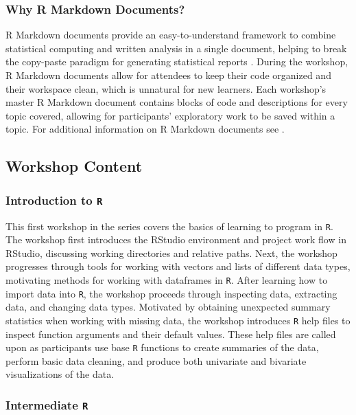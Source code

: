 \documentclass[12pt]{article}
\begin{document}
\subsubsection{Why R Markdown Documents?}

\quad R Markdown documents provide an easy-to-understand framework to combine
statistical computing and written analysis in a single document, helping to
break the copy-paste paradigm for generating statistical reports 
\citep{mine-rmarkdown}. During the workshop, R Markdown documents allow for 
attendees to keep their code organized and their workspace clean, which is
unnatural for new learners. Each workshop's master R Markdown document contains
blocks of code and descriptions for every topic covered, allowing for
participants' exploratory work to be saved within a topic. For additional
information on R Markdown documents see \citeauthor{mine-rmarkdown}. 

\subsection{Workshop Content}

\subsubsection{Introduction to \texttt{R}}
\label{sec:introR}

\quad This first workshop in the series covers the basics of learning to program in \texttt{R}. The workshop first introduces the RStudio environment and project work flow in RStudio, discussing working directories and relative paths. Next, the workshop progresses through tools for working with vectors and lists of different data types, motivating methods for working with dataframes in \texttt{R}. After learning how to import data into \texttt{R}, the workshop proceeds through inspecting data, extracting data, and changing data types. Motivated by obtaining unexpected summary statistics when working with missing data, the workshop introduces \texttt{R} help files to inspect function arguments and their default values. These help files are called upon as participants use base \texttt{R} functions to create summaries of the data, perform basic data cleaning, and produce both univariate and bivariate visualizations of the data. 

\subsubsection{Intermediate \texttt{R}}
\label{sec:intermed}
\end{document}
